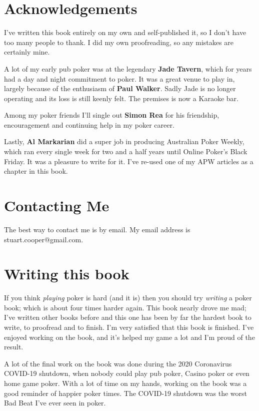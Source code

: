 \section{Acknowledgements}

I've written this book entirely on my own and self-published it, so I don't
have too many people to thank. I did my own proofreading, so any mistakes
are certainly mine.

A lot of my early pub poker was at the legendary \textbf{Jade Tavern},
which for years had a day and night commitment to poker.
It was a great venue to play in, largely because of the enthusiasm
of \textbf{Paul Walker}. Sadly Jade is no longer operating and
its loss is still keenly felt. The premises is now a Karaoke bar.

Among my poker friends I'll single out \textbf{Simon Rea} for his friendship,
encouragement and continuing help in my poker career.

Lastly, \textbf{Al Markarian} did a super job in producing Australian
Poker Weekly, which ran every single week for two and a half years
until Online Poker's Black Friday. It was a pleasure to write for
it. I've re-used one of my APW articles as a chapter in this book.

\section{Contacting Me}

The best way to contact me is by email. My email address
is stuart.cooper@gmail.com.

\section{Writing this book}

If you think \textit{playing} poker is hard (and it is) then you should try
\textit{writing} a poker book; which is about four times harder
again. This book nearly drove me mad; I've written other books before
and this one has been by far the hardest book to write, to proofread
and to finish. I'm very satisfied that this book is finished. I've
enjoyed working on the book, and it's helped my game a lot and I'm
proud of the result.

A lot of the final work on the book was done during the 2020
Coronavirus COVID-19 shutdown, when nobody could play pub poker,
Casino poker or even home game poker. With a lot of time on my hands,
working on the book was a good reminder of happier poker times. The
COVID-19 shutdown was the worst Bad Beat I've ever seen in poker.

